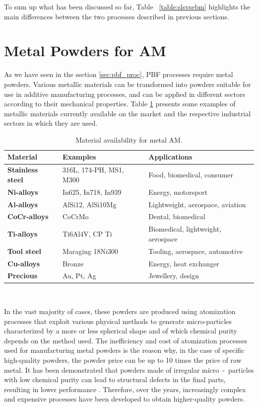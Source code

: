 To sum up what has been discussed so far, Table ~\ref{table:slsvsebm} highlights the main differences between the two processes described in previous sections.


\vfill
\section{Metal Powders for AM} 
\label{sec:metalpowders}
As we have seen in the section \ref{sec:pbf_proc}, PBF processes require metal powders. Various metallic materials can be transformed into powders suitable for use in additive manufacturing processes, and can be applied in different sectors according to their mechanical properties. Table \ref{table:materialAMmetal} presents some examples of metallic materials currently available on the market and the respective industrial sectors in which they are used.
\begin{table}
\centering 
\small
    \begin{tabular}{|l l l|}
    \hline
    \rowcolor{bluepoli!40}
    \textbf{Material} & \textbf{Examples} & \textbf{Applications}\\
    \hline \hline
    \textbf{Stainless steel} & 316L, 174-PH, MS1, M300 & Food, biomedical, consumer \T\B\\
    \textbf{Ni-alloys} & In625, In718, In939 & Energy, motorsport\T\B\\
    \textbf{Al-alloys} & AlSi12, AlSi10Mg & Lightweight, aerospace, aviation\T\B\\
    \textbf{CoCr-alloys} & CoCrMo & Dental, biomedical\T\B\\
    \textbf{Ti-alloys} & Ti6Al4V, CP Ti & Biomedical, lightweight, aerospace\T\B\\
    \textbf{Tool steel} & Maraging 18Ni300 & Tooling, aerospace, automotive\T\B\\
    \textbf{Cu-alloys} & Bronze & Energy, heat exchanger\T\B\\
    \textbf{Precious} & Au, Pt, Ag & Jewellery, design\T\B\\
    \hline
    \end{tabular}
    \\[10pt]
    \caption{Material availability for metal AM.}
    \label{table:materialAMmetal}
\end{table}
In the vast majority of cases, these powders are produced using atomization processes that exploit various physical methods to generate micro-particles characterized by a more or less spherical shape and of which chemical purity depends on the method used. The inefficiency and cost of atomization processes used for manufacturing metal powders is the reason why, in the case of specific high-quality powders, the powder price can be up to 10 times the price of raw metal. It has been demonstrated that powders made of irregular micro~-~particles with low chemical purity can lead to structural defects in the final parts, resulting in lower performance \cite{deng_origin_2020}. Therefore, over the years, increasingly complex and expensive processes have been developed to obtain higher-quality powders.

